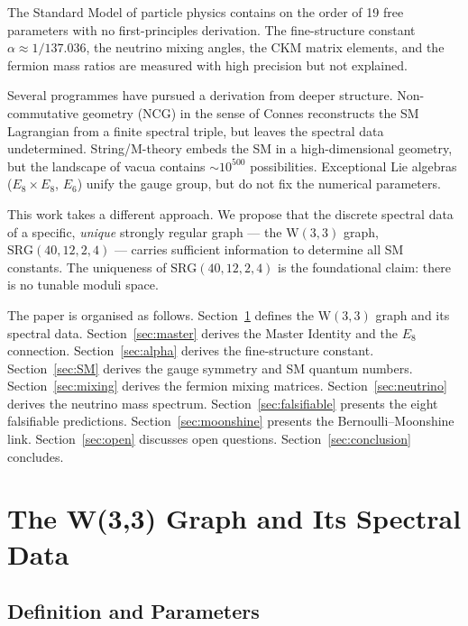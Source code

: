 \documentclass[12pt,a4paper]{article}
\newcommand{\W}{\mathrm{W}(3,3)}
\newcommand{\SRG}{\mathrm{SRG}}
\newcommand{\Eone}{E_8}
\newcommand{\Esix}{E_6}
\begin{document}
The Standard Model of particle physics contains on the order of 19
free parameters with no first-principles derivation. The fine-structure
constant $\alpha \approx 1/137.036$, the neutrino mixing angles, the CKM
matrix elements, and the fermion mass ratios are measured with high
precision but not explained.

Several programmes have pursued a derivation from deeper structure.
Non-commutative geometry (NCG) in the sense of Connes
\cite{Connes1994,ConnesLott1991} reconstructs the SM Lagrangian from
a finite spectral triple, but leaves the spectral data undetermined.
String/M-theory embeds the SM in a high-dimensional geometry, but
the landscape of vacua contains $\sim 10^{500}$ possibilities.
Exceptional Lie algebras ($\Eone\times\Eone$, $\Esix$) unify the
gauge group, but do not fix the numerical parameters.

This work takes a different approach. We propose that the discrete
spectral data of a specific, \emph{unique} strongly regular graph ---
the $\W$ graph, $\SRG(40,12,2,4)$ --- carries sufficient
information to determine all SM constants. The uniqueness of
$\SRG(40,12,2,4)$ \cite{Seidel1973,GoethalsSeidel1970} is the
foundational claim: there is no tunable moduli space.

The paper is organised as follows. Section~\ref{sec:graph} defines
the $\W$ graph and its spectral data. Section~\ref{sec:master}
derives the Master Identity and the $\Eone$ connection.
Section~\ref{sec:alpha} derives the fine-structure constant.
Section~\ref{sec:SM} derives the gauge symmetry and SM quantum
numbers. Section~\ref{sec:mixing} derives the fermion mixing
matrices. Section~\ref{sec:neutrino} derives the neutrino mass
spectrum. Section~\ref{sec:falsifiable} presents the eight
falsifiable predictions. Section~\ref{sec:moonshine} presents the
Bernoulli--Moonshine link. Section~\ref{sec:open} discusses open
questions. Section~\ref{sec:conclusion} concludes.

\section{The W(3,3) Graph and Its Spectral Data}
\label{sec:graph}

\subsection{Definition and Parameters}
\end{document}
